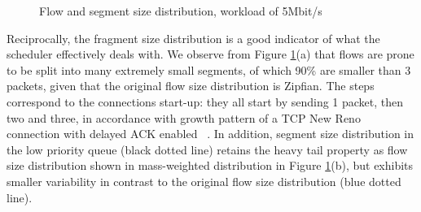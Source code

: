 \documentclass[preprint,12pt]{elsarticle}
\begin{document}
\begin{figure}[ht]
  \centering
  \caption{Flow and segment size distribution, workload of 5Mbit/s}
  \label{fig:flow_subflow}
\end{figure}

Reciprocally, the  fragment size distribution is a good indicator of what the scheduler effectively deals with. 
We observe from Figure \ref{fig:flow_subflow}(a) that flows are prone to be split into many extremely small segments, of which 90\% are smaller than 3 packets, given that the original flow size distribution is Zipfian. The steps correspond to the connections start-up: they all start by sending 1 packet, then two and three, in accordance with growth pattern of  a TCP New Reno connection with delayed ACK enabled~\cite{Sikdar01analyticmodels} . In addition, segment size distribution in the low priority queue (black dotted line) retains the heavy tail property as flow size distribution shown in mass-weighted distribution in Figure \ref{fig:flow_subflow}(b), but exhibits smaller variability in contrast to the original flow size distribution (blue dotted line). 
\end{document}
